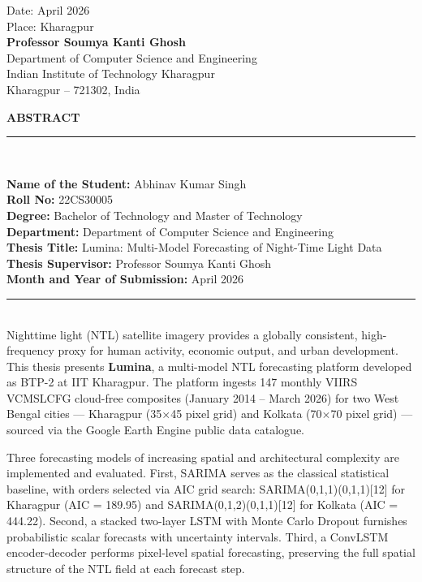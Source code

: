 \documentclass[12pt,a4paper]{report}
\begin{document}
\begin{flushright}
Date: April 2026\\
Place: Kharagpur\\[1cm]
\textbf{Professor Soumya Kanti Ghosh}\\
Department of Computer Science and Engineering\\
Indian Institute of Technology Kharagpur\\
Kharagpur -- 721302, India
\end{flushright}

\newpage
\thispagestyle{empty}

{\centering
    \hypertarget{sec:abstract}{}%
    {\Large \textbf{ABSTRACT}}\\[0.5cm]
    \noindent\rule{\linewidth}{0.6pt}\\[1cm]
}

\textbf{Name of the Student:} Abhinav Kumar Singh\\
\textbf{Roll No:} 22CS30005\\
\textbf{Degree:} Bachelor of Technology and Master of Technology\\
\textbf{Department:} Department of Computer Science and Engineering\\
\textbf{Thesis Title:} Lumina: Multi-Model Forecasting of Night-Time Light Data\\
\textbf{Thesis Supervisor:} Professor Soumya Kanti Ghosh\\
\textbf{Month and Year of Submission:} April 2026\\[0.8cm]

\noindent\rule{\linewidth}{0.6pt}\\[1cm]

Nighttime light (NTL) satellite imagery provides a globally consistent, high-frequency proxy for
human activity, economic output, and urban development. This thesis presents \textbf{Lumina}, a
multi-model NTL forecasting platform developed as BTP-2 at IIT Kharagpur. The platform ingests
147 monthly VIIRS VCMSLCFG cloud-free composites (January 2014 -- March 2026) for two West Bengal
cities --- Kharagpur (35$\times$45 pixel grid) and Kolkata (70$\times$70 pixel grid) --- sourced via
the Google Earth Engine public data catalogue.

Three forecasting models of increasing spatial and architectural complexity are implemented and
evaluated. First, SARIMA serves as the classical statistical baseline, with orders selected via
AIC grid search: SARIMA(0,1,1)(0,1,1)[12] for Kharagpur (AIC = 189.95) and
SARIMA(0,1,2)(0,1,1)[12] for Kolkata (AIC = 444.22). Second, a stacked two-layer LSTM with Monte
Carlo Dropout furnishes probabilistic scalar forecasts with uncertainty intervals. Third, a
ConvLSTM encoder-decoder performs pixel-level spatial forecasting, preserving the full spatial
structure of the NTL field at each forecast step.
\end{document}
